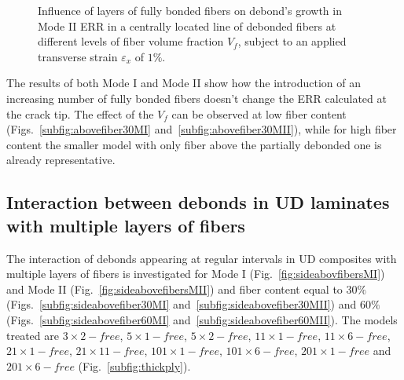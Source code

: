 \documentclass[review]{elsarticle}
\begin{document}
\begin{figure}[!h]
\caption{Influence of layers of fully bonded fibers on debond's growth in Mode II ERR in a centrally located line of debonded fibers at different levels of fiber volume fraction $V_{f}$, subject to an applied transverse strain $\varepsilon_{x}$ of $1\%$.}\label{fig:abovefibersMII}
\end{figure}

The results of both Mode I and Mode II show how the introduction of an increasing number of fully bonded fibers doesn't change the ERR calculated at the crack tip. The effect of the $V_{f}$ can be observed at low fiber content (Figs.~\ref{subfig:abovefiber30MI} and~\ref{subfig:abovefiber30MII}), while for high fiber content the smaller model with only fiber above the partially debonded one is already representative.

\subsection{Interaction between debonds in UD laminates with multiple layers of fibers}

The interaction of debonds appearing at regular intervals in UD composites with multiple layers of fibers is investigated for Mode I (Fig.~\ref{fig:sideabovfibersMI}) and Mode II (Fig.~\ref{fig:sideabovefibersMII}) and fiber content equal to $30\%$ (Figs.~\ref{subfig:sideabovefiber30MI} and~\ref{subfig:sideabovefiber30MII}) and $60\%$ (Figs.~\ref{subfig:sideabovefiber60MI} and~\ref{subfig:sideabovefiber60MII}). The models treated are $3\times 2-free$, $5\times 1-free$, $5\times 2-free$, $11\times 1-free$, $11\times 6-free$, $21\times 1-free$, $21\times 11-free$, $101\times 1-free$, $101\times 6-free$, $201\times 1-free$ and $201\times 6-free$ (Fig.~\ref{subfig:thickply}).
\end{document}
